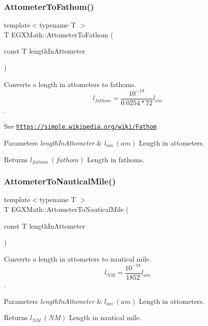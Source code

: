 \subsubsection{\texorpdfstring{Attometer\+To\+Fathom()}{AttometerToFathom()}}
{\footnotesize\ttfamily template$<$typename T $>$ \\
T E\+G\+X\+Math\+::\+Attometer\+To\+Fathom (\begin{DoxyParamCaption}\item[{const T}]{length\+In\+Attometer }\end{DoxyParamCaption})}



Converts a length in attometers to fathoms. \[ l_{fathom}= \frac{10^{-18}}{0.0254 * 72} l_{am} \]. 

See \href{https://simple.wikipedia.org/wiki/Fathom}{\tt https\+://simple.\+wikipedia.\+org/wiki/\+Fathom} 
\begin{DoxyParams}{Parameters}
{\em length\+In\+Attometer} & $ l_{am}\ (am)$ Length in attometers. \\
\hline
\end{DoxyParams}
\begin{DoxyReturn}{Returns}
$ l_{fathom}\ (fathom)$ Length in fathoms. 
\end{DoxyReturn}
\mbox{\label{group___e_g_x_math-_conversions-_length_conversions-_s_i-_attometer-_nautical_ga38f0b72d347141e8740bcf9d84a08d25}} 
\subsubsection{\texorpdfstring{Attometer\+To\+Nautical\+Mile()}{AttometerToNauticalMile()}}
{\footnotesize\ttfamily template$<$typename T $>$ \\
T E\+G\+X\+Math\+::\+Attometer\+To\+Nautical\+Mile (\begin{DoxyParamCaption}\item[{const T}]{length\+In\+Attometer }\end{DoxyParamCaption})}



Converts a length in attometers to nautical mile. \[ l_{NM}= \frac{10^{-18}}{1852} l_{am} \]. 


\begin{DoxyParams}{Parameters}
{\em length\+In\+Attometer} & $ l_{am}\ (am)$ Length in attometers. \\
\hline
\end{DoxyParams}
\begin{DoxyReturn}{Returns}
$ l_{NM}\ (NM)$ Length in nautical mile. 
\end{DoxyReturn}
